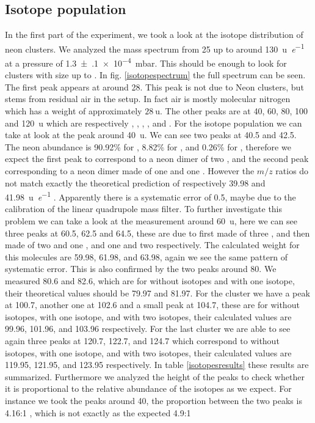 \documentclass[a4paper,10pt]{article}
\begin{document}
\subsection{Isotope population}\label{section:isotopes}
In the first part of the experiment, we took a look at the isotope distribution of neon clusters. We analyzed the mass spectrum from 25 up to around \SI{130}{\atomicmassunit \per \elementarycharge} at a pressure of \SI{1.3(1)e-4}{\milli \bar}. This should be enough to look for clusters with size up to . In fig. \ref{isotopespectrum} the full spectrum can be seen. The first peak appears at around 28. This peak is not due to Neon clusters, but stems from residual air in the setup. In fact air is mostly molecular nitrogen  which has a weight of approximately $\SI{28}{\atomicmassunit}$. The other peaks are at 40, 60, 80, 100 and \SI{120}{\atomicmassunit} which are respectively , , , , and . For the isotope population we can take at look at the peak around \SI{40}{\atomicmassunit}. We can see two peaks at 40.5 and 42.5. The neon abundance is 90.92\% for , 8.82\% for , and 0.26\% for  \cite{script}, therefore we expect the first peak to correspond to a neon dimer of two , and the second peak corresponding to a neon dimer made of one  and one . However the $m/z$ ratios do not match exactly the theoretical prediction of respectively 39.98 and \SI{41.98}{\atomicmassunit \per \elementarycharge} \cite{umc}. Apparently there is a systematic error of 0.5, maybe due to the calibration of the linear quadrupole mass filter. To further investigate this problem we can take a look at the measurement around \SI{60}{\atomicmassunit}, here we can see three peaks at 60.5, 62.5 and 64.5, these are due to  first made of three , and then made of two  and one , and one  and two  respectively. The calculated weight for this molecules are 59.98, 61.98, and 63.98, again we see the same pattern of systematic error. This is also confirmed by the two peaks around 80. We measured 80.6 and 82.6, which are for  without isotopes and  with one  isotope, their theoretical values should be 79.97 and 81.97. For the cluster  we have a peak at 100.7, another one at 102.6 and a small peak at 104.7, these are for  without isotopes,  with one  isotope, and  with two  isotopes, their calculated values are 99.96, 101.96, and 103.96 respectively. For the last cluster  we are able to see again three peaks at 120.7, 122.7, and 124.7 which correspond to  without isotopes,  with one  isotope, and  with two  isotopes, their calculated values are 119.95, 121.95, and 123.95 respectively. In table \ref{isotopesresults} these results are summarized.  Furthermore we analyzed the height of the peaks to check whether it is proportional to the relative abundance of the isotopes as we expect. For instance we took the peaks around 40, the proportion between the two peaks is 4.16:1 , which is not exactly as the expected 4.9:1 
\end{document}
